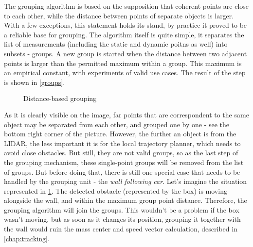 The grouping algorithm is based on the supposition that coherent points are close to each other, while the distance between points of separate objects is larger. With a few exceptions, this statement holds its stand, by practice it proved to be a reliable base for grouping. The algorithm itself is quite simple, it separates the list of measurements (including the static and dynamic poitns as well) into subsets - groups. A new group is started when the distance between two adjacent points is larger than the permitted maximum within a group. This maximum is an empirical constant, with experiments of valid use cases. The result of the step is shown in \ref{groups}.

\begin{figure}[!ht]
    \centering
    \caption{Distance-based grouping}
    \label{wall_following_car}
\end{figure}

As it is clearly visible on the image, far points that are correspondent to the same object may be separated from each other, and grouped one by one - see the bottom right corner of the picture. However, the further an object is from the LIDAR, the less important it is for the local trajectory planner, which needs to avoid close obstacles. But still, they are not valid groups, so as the last step of the grouping mechanism, these single-point groups will be removed from the list of groups. But before doing that, there is still one special case that needs to be handled by the grouping unit - the \textit{wall following car}. Let's imagine the situation represented in \ref{wall_following_car}. The detected obstacle (represented by the box) is moving alongside the wall, and within the maximum group point distance. Therefore, the grouping algorithm will join the groups. This wouldn't be a problem if the box wasn't moving, but as soon as it changes its position, grouping it together with the wall would ruin the mass center and speed vector calculation, described in \ref{chap:tracking}.

